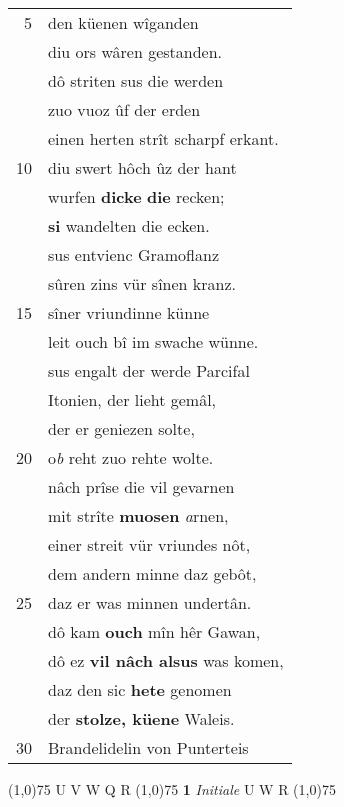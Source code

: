 \documentclass[8pt,a4paper,notitlepage]{article}
\begin{document}
\begin{table}[ht]
\begin{minipage}[t]{0.5\linewidth}
\begin{tabular}{rl}
5 & den küenen wîganden\\ 
 & diu ors wâren gestanden.\\ 
 & dô striten sus die werden\\ 
 & zuo vuoz ûf der erden\\ 
 & einen herten strît scharpf erkant.\\ 
10 & diu swert hôch ûz der hant\\ 
 & wurfen \textbf{dicke} \textbf{die} recken;\\ 
 & \textbf{si} wandelten die ecken.\\ 
 & sus entvienc Gramoflanz\\ 
 & sûren zins vür sînen kranz.\\ 
15 & sîner vriundinne künne\\ 
 & leit ouch bî im swache wünne.\\ 
 & sus engalt der werde Parcifal\\ 
 & Itonien, der lieht gemâl,\\ 
 & der er geniezen solte,\\ 
20 & o\textit{b} reht zuo rehte wolte.\\ 
 & nâch prîse die vil gevarnen\\ 
 & mit strîte \textbf{muosen} \textit{a}rnen,\\ 
 & einer streit vür vriundes nôt,\\ 
 & dem andern minne daz gebôt,\\ 
25 & daz er was minnen undertân.\\ 
 & dô kam \textbf{ouch} mîn hêr Gawan,\\ 
 & dô ez \textbf{vil nâch alsus} was komen,\\ 
 & daz den sic \textbf{hete} genomen\\ 
 & der \textbf{stolze, küene} Waleis.\\ 
30 & Brandelidelin von Punterteis\\ 
\end{tabular}
\scriptsize
\line(1,0){75} \newline
U V W Q R \newline
\line(1,0){75} \newline
\textbf{1} \textit{Initiale} U W R  \newline
\line(1,0){75} \newline

\end{minipage}
\end{table}
\end{document}
